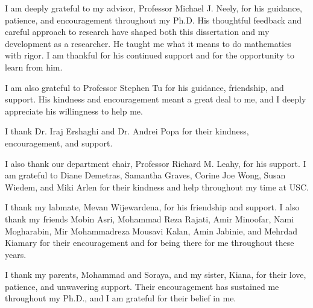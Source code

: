 I am deeply grateful to my advisor, Professor Michael J. Neely, for his
guidance, patience, and encouragement throughout my Ph.D. His thoughtful
feedback and careful approach to research have shaped both this dissertation
and my development as a researcher. He taught me what it means to do mathematics
with rigor. I am thankful for his continued support and for the opportunity to
learn from him.

I am also grateful to Professor Stephen Tu for his guidance, friendship, and
support. His kindness and encouragement meant a great deal to me, and I deeply
appreciate his willingness to help me.

I thank Dr. Iraj Ershaghi and Dr. Andrei Popa for their kindness,
encouragement, and support.

I also thank our department chair, Professor Richard M. Leahy, for his
support. I am grateful to Diane Demetras, Samantha Graves, Corine Joe Wong,
Susan Wiedem, and Miki Arlen for their kindness and help throughout my time
at USC.

I thank my labmate, Mevan Wijewardena, for his friendship and support. I also
thank my friends Mobin Asri, Mohammad Reza Rajati, Amir Minoofar, Nami
Mogharabin, Mir Mohammadreza Mousavi Kalan, Amin Jabinie, and Mehrdad Kiamary
for their encouragement and for being there for me throughout these years.

I thank my parents, Mohammad and Soraya, and my sister, Kiana, for their love,
patience, and unwavering support. Their encouragement has sustained me
throughout my Ph.D., and I am grateful for their belief in me.
